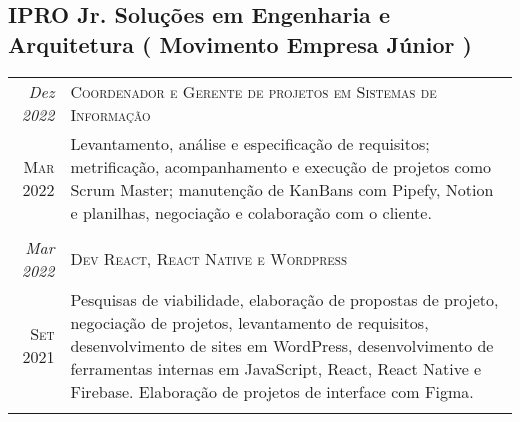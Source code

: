 \begin{mdframed}
  \subsection{  IPRO Jr. Soluções em Engenharia e Arquitetura ( Movimento Empresa Júnior )}

  \begin{tabular}{r|p{15cm}}
    \emph{Dez 2022}   & \textsc{Coordenador e Gerente de projetos em Sistemas de Informação }                                                                                                                                                                                                                                         \\
    \textsc{Mar 2022} & \footnotesize{Levantamento, análise e especificação de requisitos; metrificação, acompanhamento e execução de projetos como Scrum Master; manutenção de KanBans com Pipefy, Notion e planilhas, negociação e colaboração com o cliente.}                                                                      \\
    \multicolumn{2}{c}{}                                                                                                                                                                                                                                                                                                              \\

    \emph{Mar 2022}   & \textsc{Dev React, React Native e Wordpress }                                                                                                                                                                                                                                                                 \\
    \textsc{Set 2021} & \footnotesize{Pesquisas de viabilidade, elaboração de propostas de projeto, negociação de projetos, levantamento de requisitos, desenvolvimento de sites em WordPress, desenvolvimento de ferramentas internas em JavaScript, React, React Native e Firebase. Elaboração de projetos de interface com Figma.} \\
    \multicolumn{2}{c}{}                                                                                                                                                                                                                                                                                                              \\


\end{tabular}
\end{mdframed}
